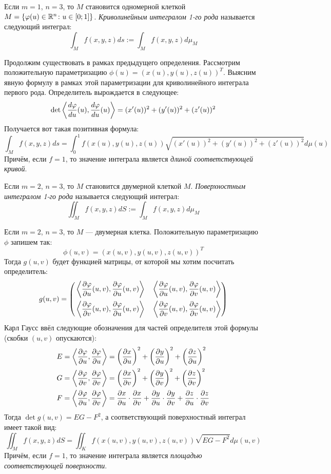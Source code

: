 \begin{definition}
	Если $m = 1$, $n = 3$, то $M$ становится одномерной клеткой $M = \{\varphi(u) \in \mathbb{R}^n \colon u \in [0; 1]\}$. \textit{Криволинейным интегралом 1-го рода} называется следующий интеграл:
	\[
		\int_M f(x, y, z)ds := \int_M f(x, y, z)d\mu_M
	\]
\end{definition}

\begin{note}
	Продолжим существовать в рамках предыдущего определения. Рассмотрим положительную параметризацию $\phi(u) = (x(u), y(u), z(u))^T$. Выясним явную формулу в рамках этой параметризации для криволинейного интеграла первого рода. Определитель вырождается в следующее:
	\[
		\det\left\langle\frac{d\varphi}{du}(u), \frac{d\varphi}{du}(u)\right\rangle = (x'(u))^2 + (y'(u))^2 + (z'(u))^2
	\]
	Получается вот такая позитивная формула:
	\[
		\int_M f(x, y, z)ds = \int_0^1 f(x(u), y(u), z(u))\sqrt{(x'(u))^2 + (y'(u))^2 + (z'(u))^2}d\mu(u)
	\]
	Причём, если $f = 1$, то значение интеграла является \textit{длиной соответствующей кривой}.
\end{note}

\begin{definition}
	Если $m = 2$, $n = 3$, то $M$ становится двумерной клеткой $M$. \textit{Поверхностным интегралом 1-го рода} называется следующий интеграл:
	\[
		\iint_M f(x, y, z)dS := \int_M f(x, y, z)d\mu_M
	\]
\end{definition}

\begin{note}
	Если $m = 2$, $n = 3$, то $M$ --- двумерная клетка. Положительную параметризацию $\phi$ запишем так:
	\[
		\phi(u, v) = (x(u, v), y(u, v), z(u, v))^T
	\]
	Тогда $g(u, v)$ будет функцией матрицы, от которой мы хотим посчитать определитель:
	\[
		g(u, v) = \left(\begin{aligned}
			&\left\langle\frac{\partial \varphi}{\partial u}(u, v), \frac{\partial \varphi}{\partial u}(u, v)\right\rangle& &\left\langle\frac{\partial \varphi}{\partial u}(u, v), \frac{\partial \varphi}{\partial v}(u, v)\right\rangle
			\\
			&\left\langle\frac{\partial \varphi}{\partial v}(u, v), \frac{\partial \varphi}{\partial u}(u, v)\right\rangle& &\left\langle\frac{\partial \varphi}{\partial v}(u, v), \frac{\partial \varphi}{\partial v}(u, v)\right\rangle
		\end{aligned}\right)
	\]
	Карл Гаусс ввёл следующие обозначения для частей определителя этой формулы (скобки $(u, v)$ опускаются):
	\begin{align*}
		&{E = \left\langle\frac{\partial \varphi}{\partial u}, \frac{\partial \varphi}{\partial u}\right\rangle = \left(\frac{\partial x}{\partial u}\right)^2 + \left(\frac{\partial y}{\partial u}\right)^2 + \left(\frac{\partial z}{\partial u}\right)^2}
		\\
		&{G = \left\langle\frac{\partial \varphi}{\partial v}, \frac{\partial \varphi}{\partial v}\right\rangle = \left(\frac{\partial x}{\partial v}\right)^2 + \left(\frac{\partial y}{\partial v}\right)^2 + \left(\frac{\partial z}{\partial v}\right)^2}
		\\
		&{F = \left\langle\frac{\partial \varphi}{\partial u}, \frac{\partial \varphi}{\partial v}\right\rangle = \frac{\partial x}{\partial u} \cdot \frac{\partial x}{\partial v} + \frac{\partial y}{\partial u} \cdot \frac{\partial y}{\partial v} + \frac{\partial z}{\partial u} \cdot \frac{\partial z}{\partial v}}
	\end{align*}
	Тогда $\det g(u, v) = EG - F^2$, а соответствующий поверхностный интеграл имеет такой вид:
	\[
		\iint_M f(x, y, z)dS = \iint_K f(x(u, v), y(u, v), z(u, v))\sqrt{EG - F^2}d\mu(u, v)
	\]
	Причём, если $f = 1$, то значение интеграла является \textit{площадью соответствующей поверхности}.
\end{note}

